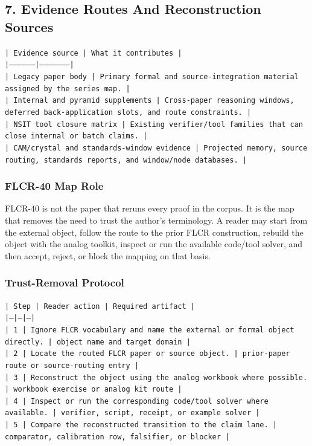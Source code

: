 \documentclass[11pt]{article}
\begin{document}
\subsection*{7. Evidence Routes And Reconstruction Sources}

\noindent\texttt{| Evidence source | What it contributes |}\\
\noindent\texttt{|-----------------|---------------------|}\\
\noindent\texttt{| Legacy paper body | Primary formal and source-integration material assigned by the series map. |}\\
\noindent\texttt{| Internal and pyramid supplements | Cross-paper reasoning windows, deferred back-application slots, and route constraints. |}\\
\noindent\texttt{| NSIT tool closure matrix | Existing verifier/tool families that can close internal or batch claims. |}\\
\noindent\texttt{| CAM/crystal and standards-window evidence | Projected memory, source routing, standards reports, and window/node databases. |}\\

\subsubsection*{FLCR-40 Map Role}

FLCR-40 is not the paper that reruns every proof in the corpus. It is the map that removes the need to trust the author's terminology. A reader may start from the external object, follow the route to the prior FLCR construction, rebuild the object with the analog toolkit, inspect or run the available code/tool solver, and then accept, reject, or block the mapping on that basis.

\subsubsection*{Trust-Removal Protocol}

\noindent\texttt{| Step | Reader action | Required artifact |}\\
\noindent\texttt{|---|---|---|}\\
\noindent\texttt{| 1 | Ignore FLCR vocabulary and name the external or formal object directly. | object name and target domain |}\\
\noindent\texttt{| 2 | Locate the routed FLCR paper or source object. | prior-paper route or source-routing entry |}\\
\noindent\texttt{| 3 | Reconstruct the object using the analog workbook where possible. | workbook exercise or analog kit route |}\\
\noindent\texttt{| 4 | Inspect or run the corresponding code/tool solver where available. | verifier, script, receipt, or example solver |}\\
\noindent\texttt{| 5 | Compare the reconstructed transition to the claim lane. | comparator, calibration row, falsifier, or blocker |}\\
\end{document}

